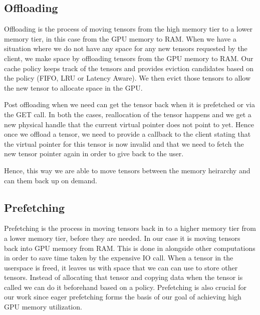 \documentclass{article}
\begin{document}
\subsection{Offloading}

Offloading is the process of moving tensors from the high memory tier to a lower memory tier, in this case from the GPU memory to RAM. When we have a situation where we do
not have any space for any new tensors requested by the client, we make space by offloading tensors from the
GPU memory to RAM. Our cache policy keeps track of the tensors and provides eviction candidates based on the policy (FIFO, LRU or Latency Aware). We then 
evict those tensors to allow the new tensor to allocate space in the GPU.

Post offloading when we need can get the tensor back when it is prefetched or via the GET call. In both the cases,
reallocation of the tensor happens and we get a new physical handle that the current virtual pointer does not point
to yet. Hence once we offload a tensor, we need to provide a callback to the client stating that the virtual pointer
for this tensor is now invalid and that we need to fetch the new tensor pointer again in order to give back to the user.

Hence, this way we are able to move tensors between the memory heirarchy and can them back up on demand.

\subsection{Prefetching}

Prefetching is the process in moving tensors back in to a higher memory tier from a lower memory tier, before they are needed. In our case it is moving tensors back into GPU memory from RAM.
This is done in alongside other computations in order to save time taken by the expensive IO call. When a tensor in the userspace is freed, it leaves us with space
that we can can use to store other tensors. Instead of allocating that tensor and copying data when the tensor is called we can do it beforehand based on a policy. Prefetching is also
crucial for our work since eager prefetching forms the basis of our goal of achieving high GPU memory utilization.
\end{document}
